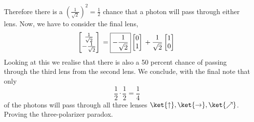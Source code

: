 \documentclass{article}
\begin{document}
    Therefore there is a $(\frac{1}{\sqrt{2}})^{2} = \frac{1}{2}$ chance that a photon will pass through either lens. Now, we have to consider the final lens, $$\begin{bmatrix}
        \frac{1}{\sqrt{2}}\\
        -\frac{1}{\sqrt{2}}
    \end{bmatrix}\\ = \boxed{-\frac{1}{\sqrt{2}}}\begin{bmatrix}
        0\\
        1
    \end{bmatrix}\\+ \frac{1}{\sqrt{2}}\begin{bmatrix}
        1\\
        0
    \end{bmatrix}\\$$   Looking at this we realise that there is also a 50 percent chance of passing through the third lens from the second lens. We conclude, with the final note that only $$\frac{1}{2} \cdot \frac{1}{2} = \boxed{\frac{1}{4}}$$ of the photons will pass through all three lenses $\ket{\uparrow}, \ket{\rightarrow}, \ket{\nearrow}$. Proving the three-polarizer paradox.
\end{document}
